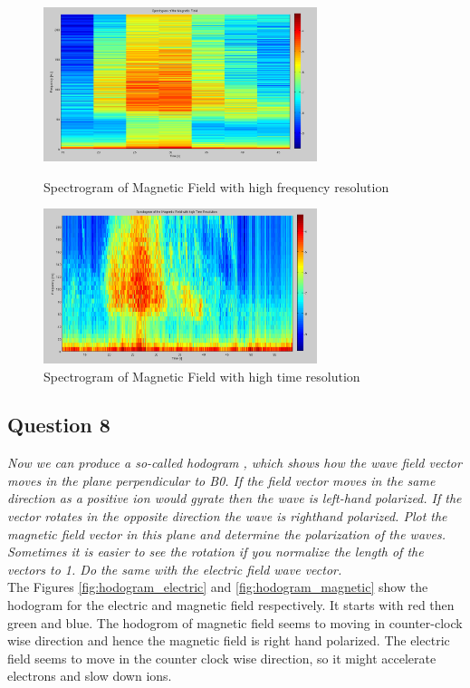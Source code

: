 \documentclass{article}
\begin{document}
\begin{figure}[htb!]
\begin{minipage}[c]{0.5\linewidth}
\centering
\includegraphics[width=8cm]{Figures/spectrogram_magnetic_highF.png}
\caption{Spectrogram of Magnetic Field with high frequency resolution}
\label{fig:spectrogram_magnetic_highF}
\end{minipage}
\hspace{0.1cm}
\begin{minipage}[c]{0.5\linewidth}
\centering
\includegraphics[width=8cm]{Figures/spectrogram_magnetic_highT.png}
\caption{Spectrogram of Magnetic Field with high time resolution}
\label{fig:spectrogram_magnetic_highT}
\end{minipage}
\end{figure}

\subsection{Question 8}
\textit{Now we can produce a so-called hodogram , which shows how the wave field vector moves in the plane perpendicular to B0. If the field vector moves in the same direction as a positive ion would gyrate then the wave is left-hand polarized. If the vector rotates in the opposite direction the wave is righthand polarized. Plot the magnetic field vector in this plane and determine the polarization of the waves. Sometimes it is easier to see the rotation if you normalize the length of the vectors to 1. Do the same with the electric field wave vector.}\\

The Figures \ref{fig:hodogram_electric} and \ref{fig:hodogram_magnetic} show the hodogram for the electric and magnetic field respectively. It starts with red then green and blue. The hodogrom of magnetic field seems to moving in counter-clock wise direction and hence the magnetic field is right hand polarized. The electric field seems to move in the counter clock wise direction, so it might accelerate electrons and slow down ions.
\end{document}
